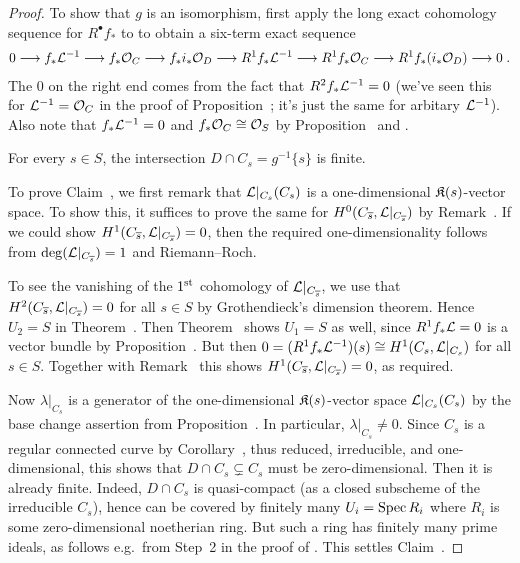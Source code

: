 \documentclass[a4paper,parskip=half,numbers=enddot, DIV=12]{scrreprt}
\begin{document}
\begin{proof}
	To show that $g$ is an isomorphism, first apply the long exact cohomology sequence for $R^\bullet f_*$ to  to obtain a six-term exact sequence
	\begin{align}\lbl{eq:sixtermRpSequence}
		0\morphism f_*\Ll^{-1}\morphism f_*\Oo_C\morphism f_*i_*\Oo_D\morphism R^1f_*\Ll^{-1}\morphism R^1f_*\Oo_C\morphism R^1f_*(i_*\Oo_D)\morphism 0\;.
	\end{align}
	The $0$ on the right end comes from the fact that $R^2f_*\mathcal{L}^{-1}=0$ (we've seen this for $\mathcal{L}^{-1}=\mathcal{O}_C$ in the proof of Proposition~; it's just the same for arbitary $\mathcal{L}^{-1}$). Also note that $f_*\mathcal{L}^{-1}=0$ and $f_*\mathcal{O}_C\cong\mathcal{O}_S$ by Proposition~ and .
	\begin{claim}
		For every $s\in S$, the intersection $D\cap C_s=g^{-1}\{s\}$ is finite.
	\end{claim}
	To prove Claim~, we first remark that $\mathcal{L}|_{C_s}(C_s)$ is a one-dimensional $\mathfrak{K}(s)$-vector space. To show this, it suffices to prove the same for $H^0(C_{\overline{s}},\mathcal{L}|_{C_{\overline{s}}})$ by Remark~. If we could show $H^1(C_{\overline{s}},\mathcal{L}|_{C_{\overline{s}}})=0$, then the required one-dimensionality follows from $\deg(\mathcal{L}|_{C_{\overline{s}}})=1$ and Riemann--Roch. 
	
	To see the vanishing of the $1^{\text{st}}$ cohomology of $\mathcal{L}|_{C_{\overline{s}}}$, we use that $H^2(C_{\overline{s}},\mathcal{L}|_{C_{\overline{s}}})=0$ for all $s\in S$ by Grothendieck's dimension theorem. Hence $U_2=S$ in Theorem~. Then Theorem~ shows $U_1=S$ as well, since $R^1f_*\mathcal{L}=0$ is a vector bundle by Proposition~. But then $0=(R^1f_*\mathcal{L}^{-1})(s)\cong H^1(C_s,\mathcal{L}|_{C_s})$ for all $s\in S$. Together with Remark~ this shows $H^1(C_{\overline{s}},\mathcal{L}|_{C_{\overline{s}}})=0$, as required.
	
	Now $\lambda|_{C_s}$ is a generator of the one-dimensional $\mathfrak{K}(s)$-vector space $\mathcal{L}|_{C_s}(C_s)$ by the base change assertion from Proposition~. In particular, $\lambda|_{C_s}\neq 0$. Since $C_s$ is a regular connected curve by Corollary~, thus reduced, irreducible, and one-dimensional, this shows that $D\cap C_s\subsetneq C_s$ must be zero-dimensional. Then it is already finite. Indeed, $D\cap C_s$ is quasi-compact (as a closed subscheme of the irreducible $C_s$), hence can be covered by finitely many $U_i=\operatorname{Spec} R_i$ where $R_i$ is some zero-dimensional noetherian ring. But such a ring has finitely many prime ideals, as follows e.g.\ from Step~2 in the proof of \cite[Proposition~3.1.1]{alg2}. This settles Claim~.
	

\end{proof}
\end{document}
